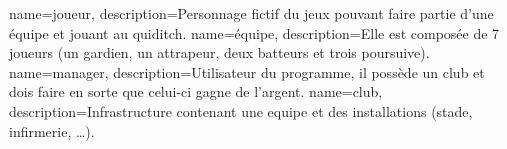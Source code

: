 {
    name=joueur,
    description={Personnage fictif du jeux pouvant faire partie d'une équipe et jouant au quiditch.}
}
{
    name=équipe,
    description={Elle est composée de 7 \glspl{joueur} (un gardien, un attrapeur, deux batteurs et trois poursuive).}
}
{
    name=manager,
    description={Utilisateur du programme, il possède un \gls{club} et dois faire en sorte que celui-ci gagne de l'argent.}
}
{
    name=club,
    description={Infrastructure contenant une \gls{equipe} et des installations (stade, infirmerie, \ldots).}
}

